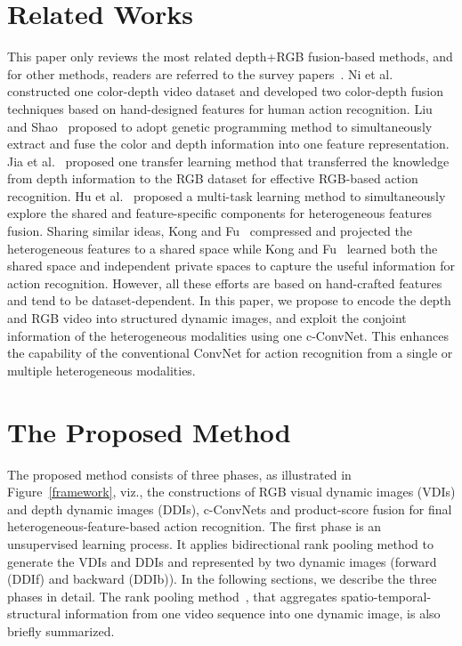 \documentclass[letterpaper]{article} %
\begin{document}
\section{Related Works}\label{relatedwork}
This paper only reviews the most related depth+RGB fusion-based methods, and for other methods, readers are referred to the survey papers~\cite{aggarwal2014human,presti20163d,zhang2016rgb}. Ni et al.~\cite{ni2011colour} constructed one color-depth video dataset and developed two color-depth fusion techniques based on hand-designed features for human action recognition.  Liu and Shao~\cite{liu2013learning} proposed to adopt genetic programming method to simultaneously extract and fuse the color and depth information into one feature representation. Jia et al.~\cite{jia2014latent} proposed one transfer learning method that transferred the knowledge from depth information to the RGB dataset for effective RGB-based action recognition. Hu et al.~\cite{hu2015jointly} proposed a multi-task learning method to simultaneously explore the shared and
feature-specific components for heterogeneous features fusion. Sharing similar ideas, Kong and Fu~\cite{Kong2015CVPR} compressed and projected the
heterogeneous features to a shared space while Kong and Fu~\cite{kong2017max} learned both the shared space and independent private spaces to capture the useful information for action recognition. However, all these efforts are based on hand-crafted features and tend to be dataset-dependent. In this paper, we propose to encode the depth and RGB video into structured dynamic images, and exploit the conjoint information of the heterogeneous modalities using one c-ConvNet. This enhances the capability of the conventional ConvNet for action recognition from a single or multiple heterogeneous modalities.




\section{The Proposed Method}\label{hConvNets}
The proposed method consists of three phases, as illustrated in Figure~\ref{framework}, viz., the constructions of RGB visual dynamic images (VDIs) and depth dynamic images (DDIs), c-ConvNets and product-score fusion for final heterogeneous-feature-based action recognition. The first phase is an unsupervised learning process. It applies bidirectional rank pooling method to generate the VDIs and DDIs and represented by two dynamic images (forward (DDIf) and backward (DDIb)). In the following sections, we describe the three phases in detail. The rank pooling method~\cite{bilen2016dynamic}, that aggregates spatio-temporal-structural information from one video sequence into one dynamic image, is also briefly summarized.
\end{document}
